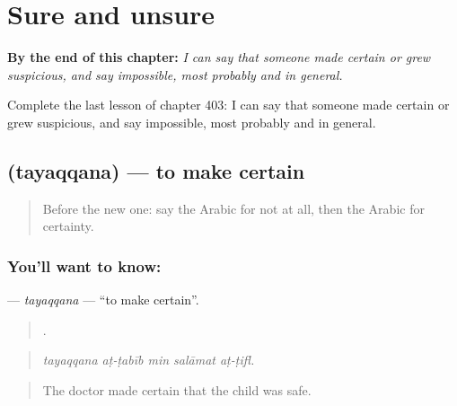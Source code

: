 
\chapter{Sure and unsure}
\label{ch:ar-sure-and-unsure}

\begin{chapteropening}
\textbf{By the end of this chapter:} \emph{I can say that someone made certain or grew suspicious, and say impossible, most probably and in general.}

Complete the last lesson of chapter 403: I can say that someone made certain or grew suspicious, and say impossible, most probably and in general.
\end{chapteropening}

\section[\texorpdfstring{\ar{تيقن} (tayaqqana)}{تيقن (tayaqqana)}]{ (tayaqqana) — to make certain}

\label{lesson:AR-C403-tayaqqana}



\begin{quote}
Before the new one: say the Arabic for not at all, then the Arabic for certainty.
\end{quote}

\subsection*{You'll want to know: }
\textbf{} — \emph{tayaqqana} — \textquotedblleft{}to make certain\textquotedblright{}.

\begin{quote}
    .
\end{quote}

\begin{quote}
\emph{tayaqqana aṭ-ṭabīb min salāmat aṭ-ṭifl.}
\end{quote}

\begin{quote}
The doctor made certain that the child was safe.
\end{quote}

